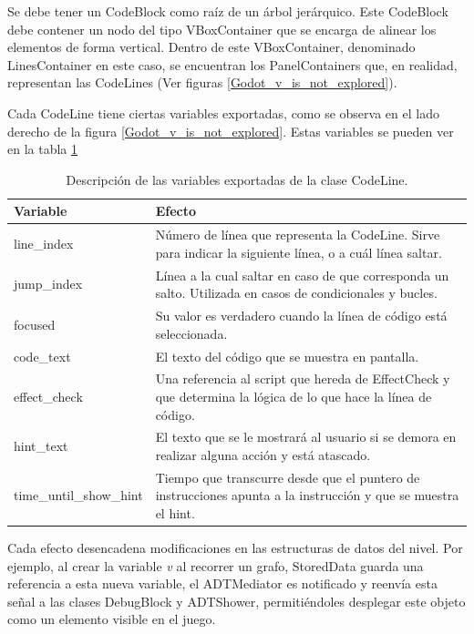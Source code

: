 Se debe tener un CodeBlock como raíz de un árbol jerárquico. Este CodeBlock debe contener un nodo del tipo VBoxContainer que se encarga de alinear los elementos de forma vertical. Dentro de este VBoxContainer, denominado LinesContainer en este caso, se encuentran los PanelContainers que, en realidad, representan las CodeLines (Ver figuras \ref{Godot_v_is_not_explored}).

Cada CodeLine tiene ciertas variables exportadas, como se observa en el lado derecho de la figura \ref{Godot_v_is_not_explored}. Estas variables se pueden ver en la tabla \ref{table_code_line_variables}

\begin{table}[!h]
    \centering
    \begin{tabular}{|l|p{}|}
        \hline
        \textbf{Variable} & \textbf{Efecto} \\
        \hline
        line\_index & Número de línea que representa la CodeLine. Sirve para indicar la siguiente línea, o a cuál línea saltar. \\
        \hline
        jump\_index  & Línea a la cual saltar en caso de que corresponda un salto. Utilizada en casos de condicionales y bucles. \\
        \hline
        focused & Su valor es verdadero cuando la línea de código está seleccionada. \\
        \hline
		code\_text & El texto del código que se muestra en pantalla. \\
        \hline
        effect\_check & Una referencia al script que hereda de EffectCheck y que determina la lógica de lo que hace la línea de código. \\
        \hline
        hint\_text  & El texto que se le mostrará al usuario si se demora en realizar alguna acción y está atascado. \\
        \hline
        time\_until\_show\_hint & Tiempo que transcurre desde que el puntero de instrucciones apunta a la instrucción y que se muestra el hint. \\
        \hline
    \end{tabular}
    \caption{Descripción de las variables exportadas de la clase CodeLine.}
    \label{table_code_line_variables}
\end{table}


Cada efecto desencadena modificaciones en las estructuras de datos del nivel. Por ejemplo, al crear la variable \emph{v} al recorrer un grafo, StoredData guarda una referencia a esta nueva variable, el ADTMediator es notificado y reenvía esta señal a las clases DebugBlock y ADTShower, permitiéndoles desplegar este objeto como un elemento visible en el juego.



